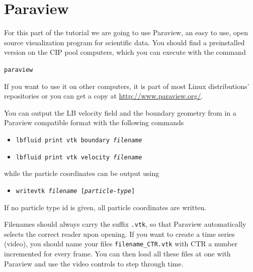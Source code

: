 \section{\label{sec:paraview}Paraview}

For this part of the tutorial we are going to use Paraview, an easy to use, open source visualization program for scientific data. You should find a preinstalled version on the CIP pool computers, which you can execute with the command
%
\begin{center}
\texttt{paraview}
\end{center}
%
If you want to use it on other computers, it is part of most Linux distributions' repositories or you can get a copy at \href{http://www.paraview.org/}{http://www.paraview.org/}.

You can output the LB velocity field and the boundary geometry from \ES{} in a Paraview compatible format with the following commands
%
\begin{itemize}
\item \texttt{lbfluid print vtk boundary \textit{filename}}
\item \texttt{lbfluid print vtk velocity \textit{filename}}
\end{itemize}
%
while the particle coordinates can be output using
\begin{itemize}
\item \texttt{writevtk \textit{filename} [\textit{particle-type}]}
\end{itemize}
%
If no particle type id is given, all particle coordinates are written.

Filenames should always carry the suffix \texttt{.vtk}, so that Paraview automatically selects the correct reader upon opening. If you want to create a time series (video), you should name your files \texttt{filename\_CTR.vtk} with CTR a number incremented for every frame. You can then load all these files at one with Paraview and use the video controls to step through time.

